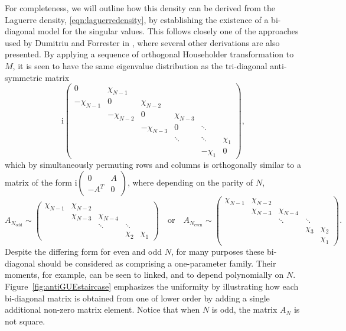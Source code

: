 \documentclass[pdftex, oneside, 10pt, letterpaper]{amsart}
\theoremstyle{plain}
\theoremstyle{definition}
\theoremstyle{remark}
\begin{document}
For completeness, we will outline how this density can be derived from
the Laguerre density, \eqref{eqn:laguerredensity}, by establishing the
existence of a bi-diagonal model for the singular values.  This
follows closely one of the approaches used by Dumitriu and Forrester
in \cite{DuFo}, where several other derivations are also presented.
By applying a sequence of orthogonal Householder transformation to
$M$, it is seen to have the same eigenvalue distribution as the
tri-diagonal anti-symmetric matrix
\[
\mathrm{i}\begin{pmatrix}
  0 & \chi_{N-1} \\
  -\chi_{N-1} & 0 & \chi_{N-2} \\
  & -\chi_{N-2} & 0 & \chi_{N-3} \\
  & & -\chi_{N-3} & 0 & \ddots \\
  & & & \ddots & \ddots & \chi_1 \\
  &&&& -\chi_1 & 0
\end{pmatrix} ,
\]
which by simultaneously permuting rows and columns is orthogonally
similar to a matrix of the form $\mathrm{i}\begin{pmatrix} 0 & A \\
  -A^T & 0\end{pmatrix}$, where depending on the parity of $N$,
\[
    A_{N_{\text{odd}}} \sim
    \begin{pmatrix}
      \chi_{N-1} & \chi_{N-2} \\ & \chi_{N-3} & \chi_{N-4} \\ & &
      \ddots & \ddots \\ & & & \chi_{2} & \chi_{1}
    \end{pmatrix}
  \quad \text{or} \quad
    A_{N_{\text{even}}} \sim
    \begin{pmatrix}
      \chi_{N-1} & \chi_{N-2} \\
      & \chi_{N-3} & \chi_{N-4} \\
      & & \ddots & \ddots \\
      & & & \chi_3 & \chi_2 \\
      & & & & \chi_{1} 
    \end{pmatrix}.
\]
Despite the differing form for even and odd $N$, for many purposes
these bi-diagonal should be considered as comprising a one-parameter
family.  Their moments, for example, can be seen to linked, and to
depend polynomially on $N$.  Figure~\ref{fig:antiGUEstaircase}
emphasizes the uniformity by illustrating how each bi-diagonal matrix
is obtained from one of lower order by adding a single additional
non-zero matrix element.  Notice that when $N$ is odd, the matrix
$A_N$ is not square.
\end{document}
